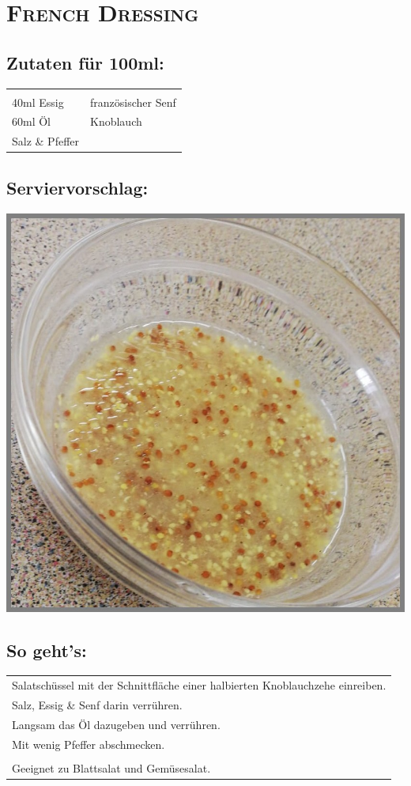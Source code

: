 \section{\textsc{French Dressing}}

\subsection*{Zutaten für 100ml:}

\begin{tabular}{p{7.5cm} p{7.5cm}}
	& \\
	40ml Essig & französischer Senf \\
	60ml Öl & Knoblauch \\
	Salz \& Pfeffer &
\end{tabular}

\subsection*{Serviervorschlag:}

\includegraphics[width=\textwidth]{img/d_french.jpeg} \cite{dfrench}

\subsection*{So geht's:}

\begin{tabular}{p{15cm}}
	\\
	Salatschüssel mit der Schnittfläche einer halbierten Knoblauchzehe einreiben.\\
	Salz, Essig \& Senf darin verrühren.\\
	Langsam das Öl dazugeben und verrühren.\\
	Mit wenig Pfeffer abschmecken.\\
	\\
	Geeignet zu Blattsalat und Gemüsesalat.
\end{tabular}
